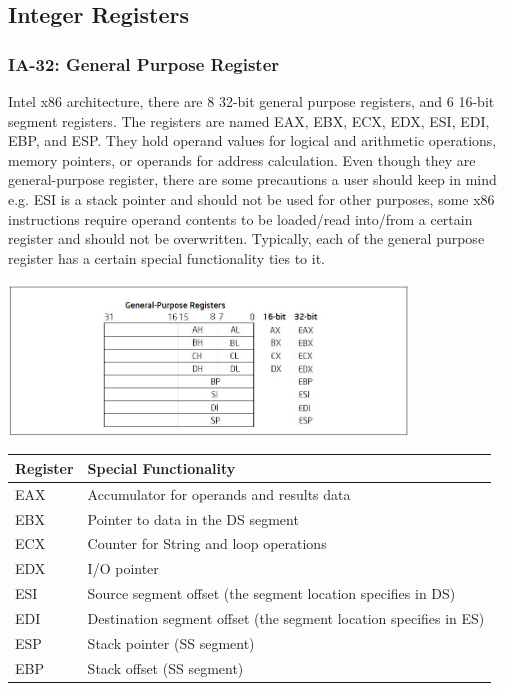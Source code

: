 \documentclass[letterpaper,10pt,titlepage]{article}
\begin{document}
\subsection{Integer Registers}

\subsubsection{IA-32: General Purpose Register}

Intel x86 architecture, there are 8 32-bit general purpose registers, and 
6 16-bit segment registers. The registers are named EAX, EBX, ECX, EDX, ESI, 
EDI, EBP, and ESP. They hold operand values for logical and arithmetic 
operations, memory pointers, or operands for address calculation. Even though
they are general-purpose register, there are some precautions a user should 
keep in mind e.g. ESI is a stack pointer and should not be used for other 
purposes, some x86 instructions require operand contents to be loaded/read
into/from a certain register and should not be overwritten. Typically, each
of the general purpose register has a certain special functionality ties to it.

\begin{center}
   \includegraphics[width=0.8\textwidth]{x86_gen_reg.JPG}

   \begin{longtable}{l p{10cm}}
      \textbf{Register} & \textbf{Special Functionality} \\ \hline
      EAX & Accumulator for operands and results data\\
      EBX & Pointer to data in the DS segment\\
      ECX & Counter for String and loop operations\\
      EDX & I/O pointer\\
      ESI & Source segment offset (the segment location specifies in DS) \\
      EDI & Destination segment offset (the segment location specifies in ES)\\
      ESP & Stack pointer (SS segment)\\
      EBP & Stack offset (SS segment)\\
      \hline
   \end{longtable}
\end{center}
\end{document}
